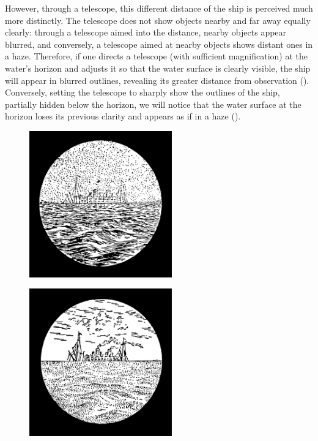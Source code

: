 However, through a telescope, this different distance of the ship is perceived much more distinctly. The telescope does not show objects nearby and far away equally clearly: through a telescope aimed into the distance, nearby objects appear blurred, and conversely, a telescope aimed at nearby objects shows distant ones in a haze. Therefore, if one directs a telescope (with sufficient magnification) at the water's horizon and adjusts it so that the water surface is clearly visible, the ship will appear in blurred outlines, revealing its greater distance from observation (). Conversely, setting the telescope to sharply show the outlines of the ship, partially hidden below the horizon, we will notice that the water surface at the horizon loses its previous clarity and appears as if in a haze ().

\begin{figure}[h!]
\centering
\includegraphics[width=0.55\textwidth]{figures/ch-06/fig-101.pdf}
\end{figure}

\begin{figure}[h!]
\centering
\includegraphics[width=0.55\textwidth]{figures/ch-06/fig-102.pdf}
\end{figure}

